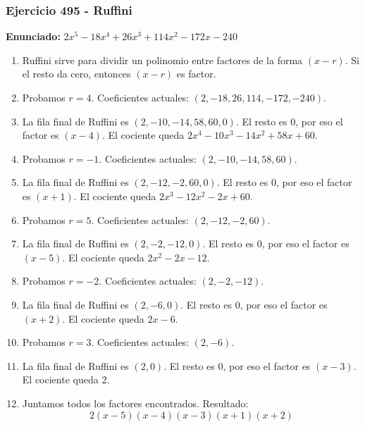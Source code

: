 \documentclass[11pt,a4paper]{article}
\begin{document}
\subsubsection*{Ejercicio 495 - Ruffini}
\textbf{Enunciado:} $ 2 x^{5} - 18 x^{4} + 26 x^{3} + 114 x^{2} - 172 x - 240 $\par
\begin{enumerate}[leftmargin=2em]
\item Ruffini sirve para dividir un polinomio entre factores de la forma \((x-r)\). Si el resto da cero, entonces \((x-r)\) es factor.
\item Probamos \(r=4\). Coeficientes actuales: \((2, -18, 26, 114, -172, -240)\).
\item La fila final de Ruffini es \((2, -10, -14, 58, 60, 0)\). El resto es \(0\), por eso el factor es \((x-4)\). El cociente queda \(2 x^{4} - 10 x^{3} - 14 x^{2} + 58 x + 60\).
\item Probamos \(r=-1\). Coeficientes actuales: \((2, -10, -14, 58, 60)\).
\item La fila final de Ruffini es \((2, -12, -2, 60, 0)\). El resto es \(0\), por eso el factor es \((x+1)\). El cociente queda \(2 x^{3} - 12 x^{2} - 2 x + 60\).
\item Probamos \(r=5\). Coeficientes actuales: \((2, -12, -2, 60)\).
\item La fila final de Ruffini es \((2, -2, -12, 0)\). El resto es \(0\), por eso el factor es \((x-5)\). El cociente queda \(2 x^{2} - 2 x - 12\).
\item Probamos \(r=-2\). Coeficientes actuales: \((2, -2, -12)\).
\item La fila final de Ruffini es \((2, -6, 0)\). El resto es \(0\), por eso el factor es \((x+2)\). El cociente queda \(2 x - 6\).
\item Probamos \(r=3\). Coeficientes actuales: \((2, -6)\).
\item La fila final de Ruffini es \((2, 0)\). El resto es \(0\), por eso el factor es \((x-3)\). El cociente queda \(2\).
\item Juntamos todos los factores encontrados. Resultado: \[\boxed{2 \left(x - 5\right) \left(x - 4\right) \left(x - 3\right) \left(x + 1\right) \left(x + 2\right)}\]
\end{enumerate}

\vspace{0.2cm}
\end{document}
